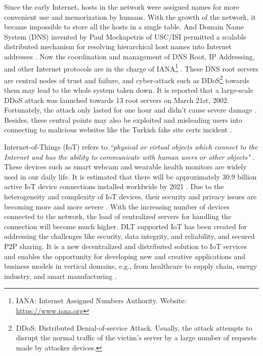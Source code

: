 Since the early Internet, hosts in the network were assigned names for more convenient use and memorization by humans. With the growth of the network, it became impossible to store all the hosts in a single table.
And Domain Name System (DNS) invented by Paul Mockapetris of USC/ISI permitted a scalable distributed mechanism for resolving hierarchical host names into Internet addresses \cite{leiner2009brief}.
Now the coordination and management of DNS Root, IP Addressing, and other Internet protocols are in the charge of IANA\footnote{IANA: Internet Assigned Numbers Authority. Website: \url{https://www.iana.org}} \cite{Postel1994DomainNS}.
These DNS root servers are central nodes of trust and failure, and cyber-attack such as DDoS\footnote{DDoS: Distributed Denial-of-service Attack.
    Usually, the attack attempts to disrupt the normal traffic of the victim's server by a large number of requests made by attacker devices.} towards them may lead to the whole system taken down.
It is reported that a large-scale DDoS attack was launched towards 13 root servers on March 21st, 2002. Fortunately, the attack only lasted for one hour and didn't cause severe damage \cite{mcguire2002attack}.
Besides, these central points may also be exploited and misleading users into connecting to malicious websites like the Turkish fake site certs incident \cite{rosenblatt_2013}.


Internet-of-Things (IoT) refers to \textit{``physical or virtual objects which connect to the Internet and has the ability to communicate with human users or other objects"} \cite{6978614}.
These devices such as smart webcam and wearable health monitors are widely used in our daily life.
It is estimated that there will be approximately 30.9 billion active IoT device connections installed worldwide by 2021 \cite{statista_2021}.
Due to the heterogeneity and complexity of IoT devices, their security and privacy issues are becoming more and more severe \cite{6978614}.
With the increasing number of devices connected to the network, the load of centralized servers for handling the connection will become much higher.
DLT supported IoT has been created for addressing the challenges like security, data integrity, and reliability, and secured P2P sharing.
It is a new decentralized and distributed solution to IoT services and enables the opportunity for developing new and creative applications and business models in vertical domains, e.g., from healthcare to supply chain, energy industry, and smart manufacturing \cite{Farahani2020TheCO}.


